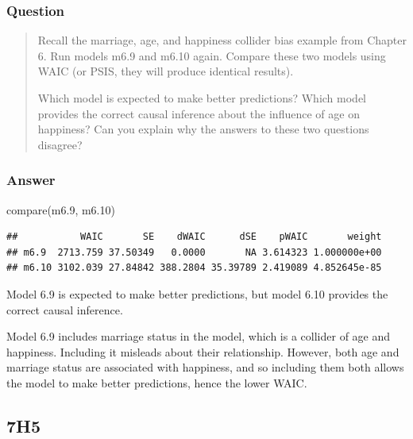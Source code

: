 \documentclass[
]{book}
\newenvironment{Shaded}{\begin{snugshade}}{\end{snugshade}}
\newcommand{\FloatTok}[1]{\textcolor[rgb]{0.00,0.00,0.81}{#1}}
\newcommand{\FunctionTok}[1]{\textcolor[rgb]{0.00,0.00,0.00}{#1}}
\newcommand{\NormalTok}[1]{#1}
\begin{document}
\hypertarget{question-73}{%
\subsubsection*{Question}\label{question-73}}

\begin{quote}
Recall the marriage, age, and happiness collider bias example from Chapter 6. Run models m6.9 and m6.10 again. Compare these two models using WAIC (or PSIS, they will produce identical results).

Which model is expected to make better predictions? Which model provides the correct causal inference about the influence of age on happiness? Can you explain why the answers to these two questions disagree?
\end{quote}

\hypertarget{answer-73}{%
\subsubsection*{Answer}\label{answer-73}}

\begin{Shaded}
\begin{Highlighting}[]
\FunctionTok{compare}\NormalTok{(m6}\FloatTok{.9}\NormalTok{, m6}\FloatTok{.10}\NormalTok{)}
\end{Highlighting}
\end{Shaded}

\begin{verbatim}
##           WAIC       SE    dWAIC      dSE    pWAIC       weight
## m6.9  2713.759 37.50349   0.0000       NA 3.614323 1.000000e+00
## m6.10 3102.039 27.84842 388.2804 35.39789 2.419089 4.852645e-85
\end{verbatim}

Model 6.9 is expected to make better predictions, but model 6.10 provides the correct causal inference.

Model 6.9 includes marriage status in the model, which is a collider of age and happiness. Including it misleads about their relationship. However, both age and marriage status are associated with happiness, and so including them both allows the model to make better predictions, hence the lower WAIC.

\hypertarget{h5-2}{%
\subsection*{7H5}\label{h5-2}}
\end{document}

